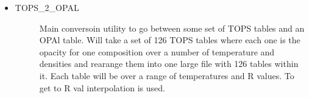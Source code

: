 \documentclass[letterpaper,10pt,english]{sphinxmanual}
\begin{document}
\begin{itemize}
\begin{description}
\end{description}

\item {} \begin{description}
\item[{TOPS\_2\_OPAL}] \leavevmode
\sphinxAtStartPar
Main conversoin utility to go between some set of TOPS tables and an OPAl
table. Will take a set of 126 TOPS tables where each one is the opacity for
one composition over a number of temperature and densities and rearange them
into one large file with 126 tables within it. Each table will be over a
range of temperatures and R values. To get to R val interpolation is used.

\end{description}

\end{itemize}
\end{document}
